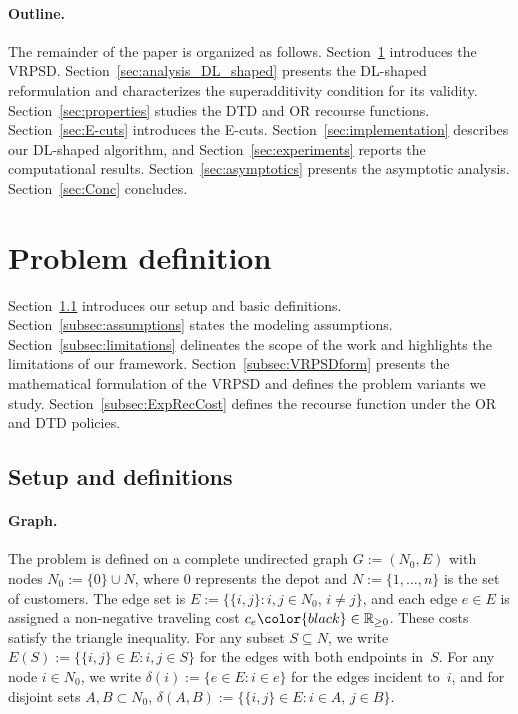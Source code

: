 \documentclass{article}
\newcommand{\rev}[1]{{\color{black}#1}}
\begin{document}
\rev{\paragraph{Outline.} The remainder of the paper is organized as follows. Section~\ref{sec:ProbForm} introduces the VRPSD. Section~\ref{sec:analysis_DL_shaped} presents the DL-shaped reformulation and characterizes the superadditivity condition for its validity. Section~\ref{sec:properties} studies the DTD and OR recourse functions. Section~\ref{sec:E-cuts} introduces the E-cuts. Section~\ref{sec:implementation} describes our DL-shaped algorithm, and Section~\ref{sec:experiments} reports the computational results. Section~\ref{sec:asymptotics} presents the asymptotic analysis. Section~\ref{sec:Conc} concludes.}

\section{Problem definition} \label{sec:ProbForm}

Section~\ref{subsec:notation} introduces our setup and basic definitions. \rev{Section~\ref{subsec:assumptions} states the modeling assumptions. Section~\ref{subsec:limitations} delineates the scope of the work and highlights the limitations of our framework.} Section~\ref{subsec:VRPSDform} presents the mathematical formulation of the VRPSD and defines the problem variants we study. Section~\ref{subsec:ExpRecCost} defines the recourse function under the OR and DTD policies.

\subsection{Setup and definitions}\label{subsec:notation}

\paragraph{Graph.} The problem is defined on a complete undirected graph $G := (N_0, E)$ with nodes $N_0 := \{0\} \cup N$, where $0$ represents the depot and $N := \{1, \ldots, n\}$ is the set of customers. The edge set is $E := \{\{i,j\} : i, j \in N_0,\, i \neq j\}$, and each edge $e \in E$ is assigned a non-negative traveling cost $c_e \rev{\in \mathbb{R}_{\geq 0}}$. These costs satisfy the triangle inequality. For any subset $S \subseteq N$, we write $E(S) := \{\{i,j\} \in E : i, j \in S\}$ for the edges with both endpoints in~$S$. For any node $i \in N_0$, we write $\delta(i) := \{e \in E : i \in e\}$ for the edges incident to~$i$, and for disjoint sets $A, B \subset N_0$, $\delta(A,B) := \{\{i,j\} \in E : i \in A,\, j \in B\}$.
 
\end{document}
